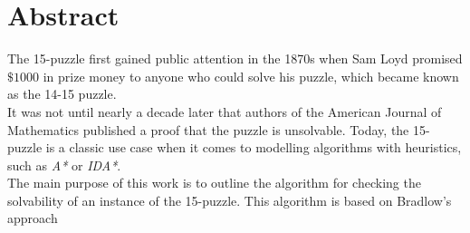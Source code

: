 \chapter*{Abstract}

The 15-puzzle first gained public attention in the 1870s when Sam Loyd promised $\$1000$ in prize money to anyone who could solve his puzzle, which became known as the 14-15 puzzle.\\
It was not until nearly a decade later that authors of the American Journal of Mathematics published a proof that the puzzle is unsolvable.
Today, the 15-puzzle is a classic use case when it comes to modelling algorithms with heuristics, such as \textit{A*} or \textit{IDA*}.\\
The main purpose of this work is to outline the algorithm for checking the solvability of an instance of the 15-puzzle.
This algorithm is based on Bradlow's approach



